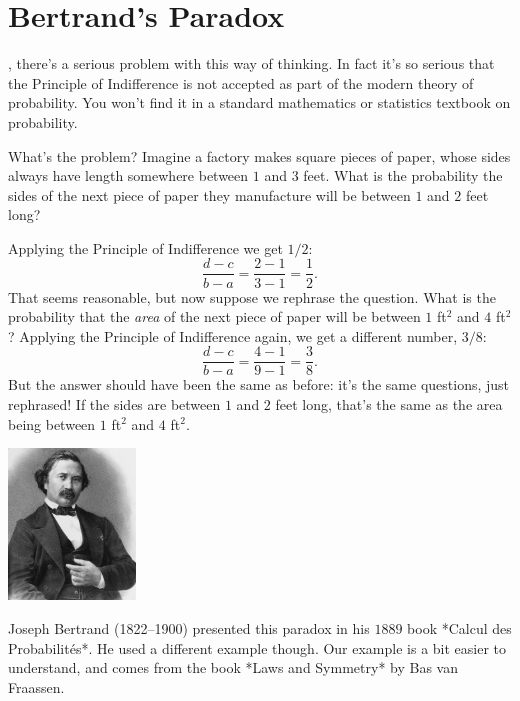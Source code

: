 \documentclass[justified]{tufte-book}
\theoremstyle{definition}
\theoremstyle{definition}
\theoremstyle{definition}
\theoremstyle{remark}
\begin{document}
\hypertarget{bertrands-paradox}{%
\section{Bertrand's Paradox}\label{bertrands-paradox}}

, there's a serious problem with this way of
thinking. In fact it's so serious that the Principle of Indifference is
not accepted as part of the modern theory of probability. You won't find
it in a standard mathematics or statistics textbook on probability.

What's the problem? Imagine a factory makes square pieces of paper,
whose sides always have length somewhere between \(1\) and \(3\) feet.
What is the probability the sides of the next piece of paper they
manufacture will be between \(1\) and \(2\) feet long?

Applying the Principle of Indifference we get \(1/2\):
\[ \frac{d-c}{b-a} = \frac{2-1}{3-1} = \frac{1}{2}. \] That seems
reasonable, but now suppose we rephrase the question. What is the
probability that the \emph{area} of the next piece of paper will be
between \(1\) ft\(^2\) and \(4\) ft\(^2\)? Applying the Principle of
Indifference again, we get a different number, \(3/8\):
\[ \frac{d-c}{b-a} = \frac{4-1}{9-1} = \frac{3}{8}. \] But the answer
should have been the same as before: it's the same questions, just
rephrased! If the sides are between \(1\) and \(2\) feet long, that's
the same as the area being between \(1\) ft\(^2\) and \(4\) ft\(^2\).

\begin{marginfigure}
\includegraphics[width=1.33in]{img/bertrand} \caption[Joseph Bertrand (1822--1900) presented this paradox in his $1889$ book *Calcul des Probabilités*]{Joseph Bertrand (1822--1900) presented this paradox in his $1889$ book *Calcul des Probabilités*. He used a different example though. Our example is a bit easier to understand, and comes from the book *Laws and Symmetry* by Bas van Fraassen.}\label{fig:unnamed-chunk-132}
\end{marginfigure}
\end{document}
